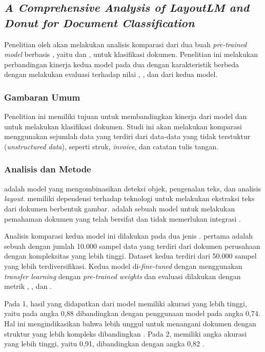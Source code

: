 \subsection{\textit{A Comprehensive Analysis of LayoutLM and Donut for Document Classification}}
\label{sec:penelitian-1}
Penelitian oleh   akan melakukan analisis komparasi dari dua buah \textit{pre-trained model} berbasis \transformer{}, yaitu \layoutlm{} dan \donut, untuk klasifikasi dokumen. Penelitian ini melakukan perbandingan kinerja kedua model pada dua \dataset{} dengan karakteristik berbeda dengan melakukan evaluasi 
terhadap nilai \accuracy, \precision, dan \fscore{} dari kedua model. 

\subsubsection{Gambaran Umum}
Penelitian ini memiliki tujuan untuk membandingkan kinerja dari model \donut{} dan \layoutlm{} untuk melakukan klasifikasi dokumen. Studi ini akan 
melakukan komparasi menggunakan sejumlah data yang terdiri dari data-data yang tidak terstuktur (\textit{unstructured data}), seperti struk, \textit{invoice}, dan catatan tulis tangan.

\subsubsection{Analisis dan Metode}
\layoutlm{} adalah model yang mengombinasikan deteksi objek, pengenalan teks, dan analisis \textit{layout}. \layoutlm{} memiliki dependensi terhadap teknologi \ocr{} untuk melakukan ekstraksi teks dari dokumen berbentuk gambar. \donut{} adalah sebuah model \transformer{} untuk melakukan pemahaman dokumen yang telah bersifat \sotafull{} dan tidak memerlukan integrasi \ocr{}.

Analisis komparasi kedua model ini dilakukan pada dua jenis \dataset. \datasetfl{} pertama adalah sebuah \dataset{} dengan jumlah 10.000 sampel data yang terdiri dari dokumen perusahaan dengan kompleksitas yang lebih tinggi. Dataset 
kedua terdiri dari 50.000 sampel yang lebih terdiversifikasi. Kedua model di-\textit{fine-tuned} dengan menggunakan \textit{transfer learning} dengan \textit{pre-trained weights} dan evaluasi dilakukan dengan metrik \accuracy, \precision, dan \fscore.  

Pada \dataset{} 1, hasil yang didapatkan dari model \layoutlm{} memiliki akurasi yang lebih tinggi, yaitu pada angka 0,88 dibandingkan dengan penggunaan model \donut{} pada angka 0,74. Hal ini mengindikasikan bahwa \layoutlm{} lebih unggul untuk menangani dokumen dengan struktur yang lebih kompleks dibandingkan \donut{}. Pada \dataset{} 2, \donut{} memiliki angka akurasi yang lebih tinggi, yaitu 0,91, dibandingkan \layoutlm{} dengan angka 0,82 \parencite{bajrami2023comprehensive}.

